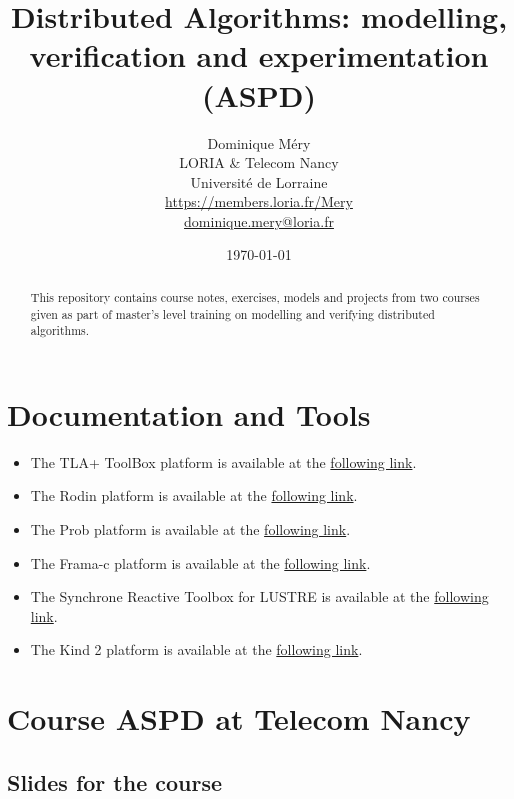 \documentclass[ 12pt]{article}
\title{Distributed Algorithms:  modelling,  verification   and experimentation  (ASPD)}
\author{Dominique M\'ery\\
LORIA \& Telecom Nancy\\ Universit\'e de Lorraine\\
\url{https://members.loria.fr/Mery}\\ \url{dominique.mery@loria.fr}}
\date{\today\\\now}
\begin{document}
  \setcounter{ex}{1}
\maketitle
\begin{abstract}
This repository contains course notes, exercises, models and projects
from two  courses given as part of master's level training on
modelling and verifying  distributed algorithms.
\end{abstract}

\tableofcontents


\section{Documentation and Tools}

\begin{itemize}

    
\item[]  The  TLA+ ToolBox  platform is available at the 
  \href{https://lamport.azurewebsites.net/tla/toolbox.html}{following 
    link}. 
\item[]  The Rodin platform is available at the 
  \href{https://www.event-b.org/install.html}{following 
    link}.

  
  \item[]  The Prob   platform is available at the 
  \href{https://prob.hhu.de}{following 
    link}. 

  
  \item[]  The Frama-c platform is available at the 
  \href{https://www.frama-c.com}{following 
    link}.

  \item[]  The Synchrone Reactive Toolbox for LUSTRE is   available at the 
  \href{https://www-verimag.imag.fr/Outils-SynchronesNEW.html?lang=en}{following 
    link}.

  \item[]  The Kind 2  platform is available at the 
  \href{ https://kind2-mc.github.io/kind2/}{following 
    link}.

  
\end{itemize}




\section{Course  ASPD  at Telecom Nancy}
\label{sec:course-mcfsi-at}


\subsection{Slides for the course}
\label{sec:slides}
\end{document}
